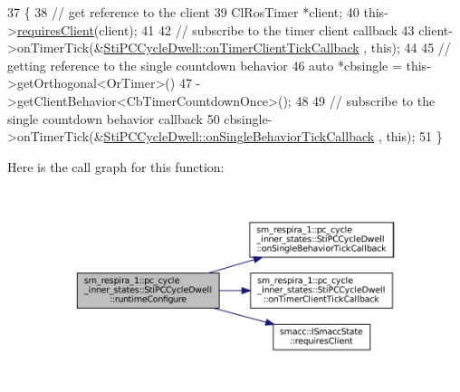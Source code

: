 \begin{DoxyCode}
37   \{
38     \textcolor{comment}{// get reference to the client}
39     ClRosTimer *client;
40     this->\hyperlink{classsmacc_1_1ISmaccState_a7f95c9f0a6ea2d6f18d1aec0519de4ac}{requiresClient}(client);
41 
42     \textcolor{comment}{// subscribe to the timer client callback}
43     client->onTimerTick(&\hyperlink{structsm__respira__1_1_1pc__cycle__inner__states_1_1StiPCCycleDwell_aaa9be342bc58926f91230ab15e4925cc}{StiPCCycleDwell::onTimerClientTickCallback}
      , \textcolor{keyword}{this});
44 
45     \textcolor{comment}{// getting reference to the single countdown behavior}
46     \textcolor{keyword}{auto} *cbsingle = this->getOrthogonal<OrTimer>()
47                           ->getClientBehavior<CbTimerCountdownOnce>();
48 
49     \textcolor{comment}{// subscribe to the single countdown behavior callback}
50     cbsingle->onTimerTick(&\hyperlink{structsm__respira__1_1_1pc__cycle__inner__states_1_1StiPCCycleDwell_a39d69f67f8b5649295ad6a66cc9c0cf8}{StiPCCycleDwell::onSingleBehaviorTickCallback}
      , \textcolor{keyword}{this});
51   \}
\end{DoxyCode}
Here is the call graph for this function\+:
\nopagebreak
\begin{figure}[H]
\begin{center}
\leavevmode
\includegraphics[width=350pt]{structsm__respira__1_1_1pc__cycle__inner__states_1_1StiPCCycleDwell_a2523862e7ca0fcc8886879dcaf4fd6d2_cgraph}
\end{center}
\end{figure}
\mbox{\label{structsm__respira__1_1_1pc__cycle__inner__states_1_1StiPCCycleDwell_a9320f3bf438cb417074efccfdd70abeb}} 
